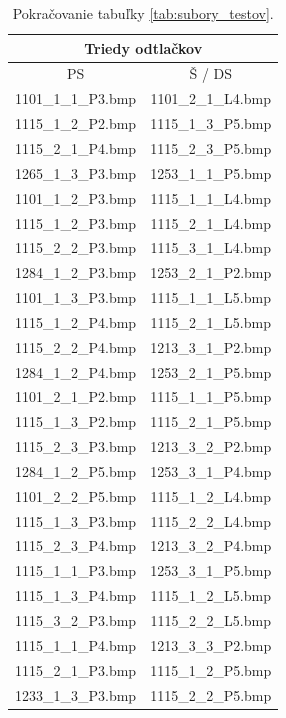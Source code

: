   \begin{table}
    \centering
    \caption{Pokračovanie tabuľky \ref{tab:subory_testov}.}
    \begin{tabular}{ | c | c | }
      \hline
      \multicolumn{2}{|c|}{Triedy odtlačkov}            \\
      \hline
      PS    & Š / DS     \\
      \hline
       1101\_1\_1\_P3.bmp & 1101\_2\_1\_L4.bmp \\
       1115\_1\_2\_P2.bmp & 1115\_1\_3\_P5.bmp \\
       1115\_2\_1\_P4.bmp & 1115\_2\_3\_P5.bmp \\
       1265\_1\_3\_P3.bmp & 1253\_1\_1\_P5.bmp \\
       1101\_1\_2\_P3.bmp & 1115\_1\_1\_L4.bmp \\
       1115\_1\_2\_P3.bmp & 1115\_2\_1\_L4.bmp \\
       1115\_2\_2\_P3.bmp & 1115\_3\_1\_L4.bmp \\
       1284\_1\_2\_P3.bmp & 1253\_2\_1\_P2.bmp \\
       1101\_1\_3\_P3.bmp & 1115\_1\_1\_L5.bmp \\
       1115\_1\_2\_P4.bmp & 1115\_2\_1\_L5.bmp \\
       1115\_2\_2\_P4.bmp & 1213\_3\_1\_P2.bmp \\
       1284\_1\_2\_P4.bmp & 1253\_2\_1\_P5.bmp \\
       1101\_2\_1\_P2.bmp & 1115\_1\_1\_P5.bmp \\
       1115\_1\_3\_P2.bmp & 1115\_2\_1\_P5.bmp \\
       1115\_2\_3\_P3.bmp & 1213\_3\_2\_P2.bmp \\
       1284\_1\_2\_P5.bmp & 1253\_3\_1\_P4.bmp \\
       1101\_2\_2\_P5.bmp & 1115\_1\_2\_L4.bmp \\
       1115\_1\_3\_P3.bmp & 1115\_2\_2\_L4.bmp \\
       1115\_2\_3\_P4.bmp & 1213\_3\_2\_P4.bmp \\
       1115\_1\_1\_P3.bmp & 1253\_3\_1\_P5.bmp \\
       1115\_1\_3\_P4.bmp & 1115\_1\_2\_L5.bmp \\
       1115\_3\_2\_P3.bmp & 1115\_2\_2\_L5.bmp \\
       1115\_1\_1\_P4.bmp & 1213\_3\_3\_P2.bmp \\
       1115\_2\_1\_P3.bmp & 1115\_1\_2\_P5.bmp \\
       1233\_1\_3\_P3.bmp & 1115\_2\_2\_P5.bmp \\

\end{tabular}
\end{table}
